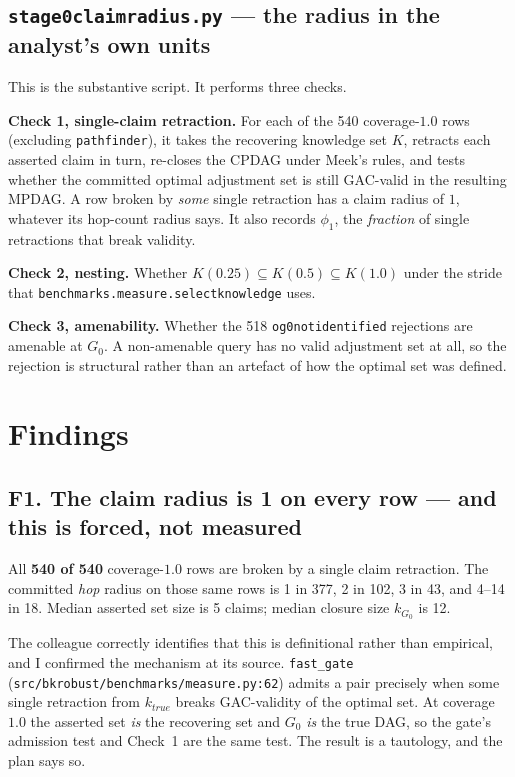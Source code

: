 \documentclass[11pt,a4paper]{article}
\newcommand{\code}[1]{\texttt{\small\hspace{0pt}#1}}
\newcommand{\ul}{\discretionary{\_}{}{\_}}
\begin{document}
\subsection{\code{stage0\ul claim\ul radius.py} --- the radius in the analyst's own units}

This is the substantive script. It performs three checks.

\textbf{Check 1, single-claim retraction.} For each of the 540 coverage-$1.0$ rows (excluding
\code{pathfinder}), it takes the recovering knowledge set $K$, retracts each asserted claim in
turn, re-closes the CPDAG under Meek's rules, and tests whether the committed optimal adjustment
set is still GAC-valid in the resulting MPDAG. A row broken by \emph{some} single retraction has a
claim radius of $1$, whatever its hop-count radius says. It also records $\phi_1$, the
\emph{fraction} of single retractions that break validity.

\textbf{Check 2, nesting.} Whether $K(0.25) \subseteq K(0.5) \subseteq K(1.0)$ under the stride
that \code{benchmarks.measure.\discretionary{}{}{}select\ul knowledge} uses.

\textbf{Check 3, amenability.} Whether the 518 \code{o\ul g0\ul not\ul identified} rejections are
amenable at $G_0$. A non-amenable query has no valid adjustment set at all, so the rejection is
structural rather than an artefact of how the optimal set was defined.

\section{Findings}

\subsection{F1. The claim radius is 1 on every row --- and this is forced, not measured}

All \textbf{540 of 540} coverage-$1.0$ rows are broken by a single claim retraction. The committed
\emph{hop} radius on those same rows is 1 in 377, 2 in 102, 3 in 43, and 4--14 in 18. Median
asserted set size is 5 claims; median closure size $k_{G_0}$ is 12.

The colleague correctly identifies that this is definitional rather than empirical, and I confirmed
the mechanism at its source. \code{fast\_gate} (\code{src/bkrobust/benchmarks/measure.py:62})
admits a pair precisely when some single retraction from $k_{true}$ breaks GAC-validity of the
optimal set. At coverage $1.0$ the asserted set \emph{is} the recovering set and $G_0$ \emph{is}
the true DAG, so the gate's admission test and Check~1 are the same test. The result is a
tautology, and the plan says so.
\end{document}
